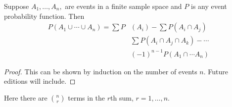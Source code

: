 \begin{proposition}
Suppose $A_1, \dots , A_n,$ are events in a finite sample space and $P$ is any event probability function.
Then
\[
\begin{aligned}
P(A_1 \cup \cdots \cup A_n) =
\sum P&(A_i) -\sum P(A_i \cap  A_j) \\
&\sum P(A_i \cap  A_j \cap  A_k) - \cdots \\
&(-1)^{n-1} P(A_1 \cap  \cdots A_n)
\end{aligned}
\]
\end{proposition}

\begin{proof}This can be shown by induction on the number of events $n$.
Future editions will include.\end{proof}
Here there are ${n \choose r}$ terms in the $r$th sum, $r = 1, \dots , n$.

\blankpage